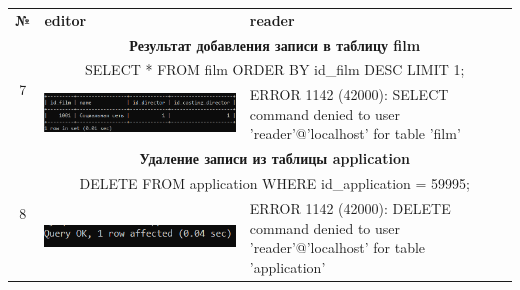 \documentclass[11pt,a4paper,final]{article} %
\begin{document}
\newpage
\begin{table}[H]
	\label{tab:tb1}
	
	\begin{tabularx}{\textwidth}{|c|X|X|}
		\cline{1-3}
		\textbf{№} & \textbf{editor} & \textbf{reader} \\
		\cline{1-3}
		
		\multirow{3}{*}{7} & \multicolumn{2}{c|}{\textbf{Результат добавления записи в таблицу film}}\\
		& \multicolumn{2}{c|}{SELECT * FROM film ORDER BY id\_film DESC LIMIT 1;} \\
		\cline{2-3}
		& 
		\vspace{-6pt}
		\hspace{-8.5pt}
		\includegraphics[width=1\linewidth]{n4.png}
		& 
		\vspace{-6pt}
		\hspace{-8.5pt}
		ERROR 1142 (42000): SELECT command denied to user 'reader'@'localhost' for table 'film'
		\\
		\cline{1-3}
		
		
		\multirow{3}{*}{8} & \multicolumn{2}{c|}{\textbf{Удаление записи из таблицы application}}\\
		& \multicolumn{2}{c|}{DELETE FROM application WHERE id\_application = 59995;} \\
		\cline{2-3}
		& 
		\vspace{-6pt}
		\hspace{-8.5pt}
		\includegraphics[width=1\linewidth]{e5.png}
		& 
		\vspace{-6pt}
		\hspace{-8.5pt}
		ERROR 1142 (42000): DELETE command denied to user 'reader'@'localhost' for table 'application'
		\\
		\cline{1-3}
		

\end{tabularx}
\end{table}
\end{document}
